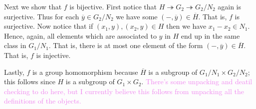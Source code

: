 \documentclass[12pt,letterpaper,boxed]{hmcpset}
\newcommand{\wg}[1]{\textcolor{violet}{#1}}
\begin{document}
\begin{solution}
\begin{itemize}
Next we show that $f$ is bijective. First notice that $H
\twoheadrightarrow G_2 \twoheadrightarrow G_2/N_2$ again is
surjective. Thus for each $\overline y \in G_2/N_2$ we have some $(-,
\overline y) \in \overline H$. That is, $f$ is surjective.
Now notice that if $(x_1, y), (x_2, y) \in H$ then we have $x_1 - x_2
\in N_1$. Hence, again, all elements which are associated to $y$ in
$H$ end up in the same class in $G_1 / N_1$. That is, there is at most
one element of the form $(-, \overline y) \in \overline H$. That is,
$f$ is injective.

Lastly, $f$ is a group homomorphism because $\overline H$ is a
subgroup of $G_1 / N_1 \times G_2 / N_2$; this follows since $H$ is a
subgroup of $G_1 \times G_2$.
\wg{There's some unpacking and deatil checking to do here, but I
currently believe this follows from unpacking all the definitions of
the objects. }

\end{itemize}
\end{solution}

\newpage
\end{document}
